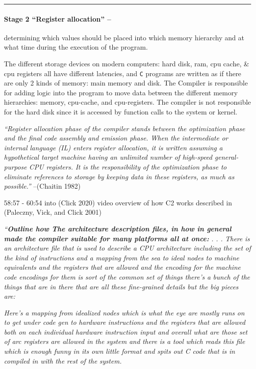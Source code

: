 \begin{center}\rule{0.5\linewidth}{0.5pt}\end{center}

\hypertarget{stage-2-register-allocation}{%
\paragraph{Stage 2 ``Register allocation''
--}\label{stage-2-register-allocation}}

determining which values should be placed into which memory hierarchy
and at what time during the execution of the program.

The different storage devices on modern computers: hard disk, ram, cpu
cache, \& cpu registers all have different latencies, and \texttt{C}
programs are written as if there are only 2 kinds of memory: main memory
and disk. The Compiler is responsible for adding logic into the program
to move data between the different memory hierarchies: memory,
cpu-cache, and cpu-registers. The compiler is not responsible for the
hard disk since it is accessed by function calls to the system or
kernel.

\emph{``Register allocation phase of the compiler stands between the
optimization phase and the final code assembly and emission phase. When
the intermediate or internal language (IL) enters register allocation,
it is written assuming a hypothetical target machine having an unlimited
number of high-speed general-purpose CPU registers. It is the
responsibility of the optimization phase to eliminate references to
storage by keeping data in these registers, as much as possible.''}
--(Chaitin 1982)

58:57 - 60:54 into (Click 2020) video overview of how C2 works described
in (Paleczny, Vick, and Click 2001)

\emph{``\textbf{Outline how The architecture description files, in how
in general made the compiler suitable for many platforms all at once:} .
. . There is an architecture file that is used to describe a CPU
architecture including the set of the kind of instructions and a mapping
from the sea to ideal nodes to machine equivalents and the registers
that are allowed and the encoding for the machine code encodings for
them is sort of the common set of things there's a bunch of the things
that are in there that are all these fine-grained details but the big
pieces are:}

\emph{Here's a mapping from idealized nodes which is what the eye are
mostly runs on to get under code gen to hardware instructions and the
registers that are allowed both on each individual hardware instruction
input and overall what are those set of arc registers are allowed in the
system and there is a tool which reads this file which is enough funny
in its own little format and spits out C code that is in compiled in
with the rest of the system.}

